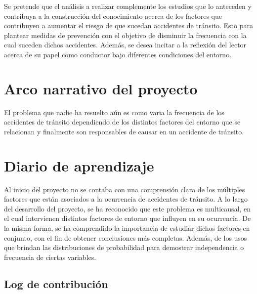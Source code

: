 \documentclass[12pt]{article}
\begin{document}
Se pretende que el análisis a realizar complemente los estudios que lo anteceden y contribuya a la construcción del conocimiento 
acerca de los factores que contribuyen a aumentar el riesgo de que sucedan accidentes de tránsito. Esto para plantear medidas de 
prevención con el objetivo de disminuir la frecuencia con la cual suceden dichos accidentes. Además, se desea incitar a la reflexión 
del lector acerca de su papel como conductor bajo diferentes condiciones del entorno.   

\section{Arco narrativo del proyecto}
El problema que nadie ha resuelto aún es como varia la frecuencia de los accidentes de tránsito dependiendo de los distintos factores del entorno que se relacionan y finalmente son responsables de causar en un accidente de tránsito. 
\section{Diario de aprendizaje}
Al inicio del proyecto no se contaba con una comprensión clara de los múltiples factores que están asociados a la 
ocurrencia de accidentes de tránsito. A lo largo del desarrollo del proyecto, se ha reconocido que este problema es 
multicausal, en el cual intervienen distintos factores de entorno que influyen en su ocurrencia. De la misma forma, 
se ha comprendido la importancia de estudiar dichos factores en conjunto, con el fin de obtener conclusiones más completas.
Además, de los usos que brindan las distribuciones de probabilidad para demostrar independencia o frecuencia de ciertas 
variables. 

\newpage
\printbibliography

\newpage
\subsection*{Log de contribución}
\end{document}
